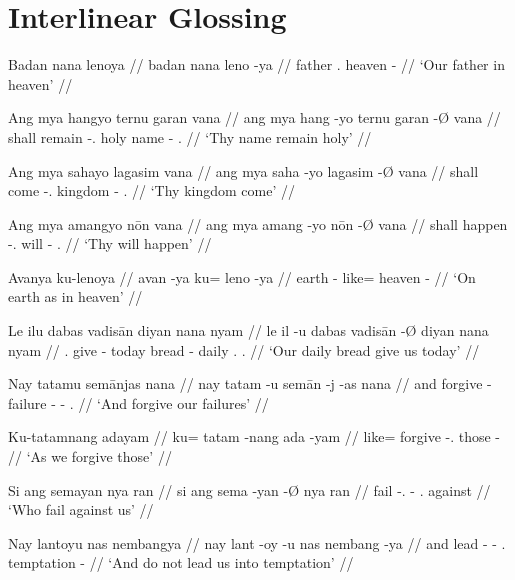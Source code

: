 \documentclass[12pt,paper=a4]{scrartcl}
\begin{document}
\section{Interlinear Glossing}

\ex %
\begingl
    \glpreamble Badan nana lenoya //
    \gla badan nana leno -ya //
    \glb father \Fpl{}.\Gen{} heaven -\Loc{} //
    \glft `Our father in heaven' //
\endgl
\xe

\ex %
\begingl
    \glpreamble Ang mya hangyo ternu garan vana //
    \gla ang mya hang -yo ternu garan -Ø vana //
    \glb \AgtT{} shall remain -\Tsg{}.\N{} holy name -\Top{} \Ssg{}.\Gen{} //
    \glft `Thy name remain holy' //
\endgl
\xe

\ex %
\begingl
    \glpreamble Ang mya sahayo lagasim vana //
    \gla ang mya saha -yo lagasim -Ø vana //
    \glb \AgtT{} shall come -\Tsg{}.\N{} kingdom -\Top{} \Ssg{}.\Gen{} //
    \glft `Thy kingdom come' //
\endgl
\xe

\ex %
\begingl
    \glpreamble Ang mya amangyo nōn vana //
    \gla ang mya amang -yo nōn -Ø vana //
    \glb \AgtT{} shall happen -\Tsg{}.\N{} will -\Top{} \Ssg{}.\Gen{} //
    \glft `Thy will happen' //
\endgl
\xe

\ex %
\begingl
    \glpreamble Avanya ku-lenoya //
    \gla avan -ya ku= leno -ya //
    \glb earth -\Loc{} like= heaven -\Loc{} //
    \glft `On earth as in heaven' //
\endgl
\xe

\ex %
\begingl
    \glpreamble Le ilu dabas vadisān diyan nana nyam //
    \gla le il -u dabas vadisān -Ø diyan nana nyam //
    \glb \PatT{}.\Inan{} give -\Imp{} today bread -\Top{} daily \Fpl{}.\Gen{} \Fpl{}.\Dat{} //
    \glft `Our daily bread give us today' //
\endgl
\xe

\ex %
\begingl
    \glpreamble Nay tatamu semānjas nana //
    \gla nay tatam -u semān -j -as nana //
    \glb and forgive -\Imp{} failure -\Pl{} -\Parg{} \Fpl{}.\Gen{} //
    \glft `And forgive our failures' //
\endgl
\xe

\ex %
\begingl
    \glpreamble Ku-tatamnang adayam //
    \gla ku= tatam -nang ada -yam //
    \glb like= forgive -\Fpl{}.\Aarg{} those -\Dat{} //
    \glft `As we forgive those' //
\endgl
\xe

\ex %
\begingl
    \glpreamble Si ang semayan nya ran //
    \gla si ang sema -yan -Ø nya ran //
    \glb \Rel{} \AgtT{} fail -\Tpl{}.\M{} -\Top{} \Fpl{}.\Loc{} against //
    \glft `Who fail against us' //
\endgl
\xe

\ex %
\begingl
    \glpreamble Nay lantoyu nas nembangya //
    \gla nay lant -oy -u nas nembang -ya //
    \glb and lead -\Neg{} -\Imp{} \Fpl{}.\Parg{} temptation -\Loc{} //
    \glft `And do not lead us into temptation' //
\endgl
\xe
\end{document}
